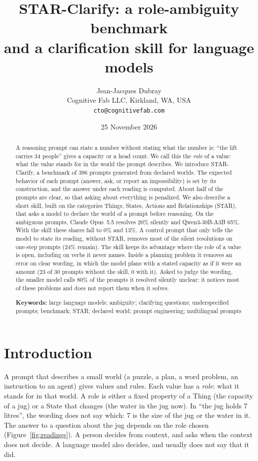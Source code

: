 \documentclass[11pt,a4paper]{article}
\title{\vspace{-1.2cm}\bfseries STAR-Clarify: a role-ambiguity benchmark\\
and a clarification skill for language models}
\author{Jean-Jacques Dubray\\[2pt]
\small Cognitive Fab LLC, Kirkland, WA, USA\\
\small \texttt{cto@cognitivefab.com}}
\date{25 November 2026}
\begin{document}
\maketitle

\begin{abstract}
\noindent
A reasoning prompt can state a number without stating what the number is:
``the lift carries 34 people'' gives a capacity or a head count. We call
this the \emph{role} of a value: what the value stands for in the world
the prompt describes. We introduce STAR-Clarify, a benchmark of 396
prompts generated from declared worlds. The expected behavior of each
prompt (answer, ask, or report an impossibility) is set by its
construction, and the answer under each reading is computed. About half of the prompts are clear, so that asking
about everything is penalized. We also describe a short skill, built on
the categories Things, States, Actions and Relationships (STAR), that asks
a model to declare the world of a prompt before reasoning. On the
ambiguous prompts, Claude Opus~5.5 resolves 20\% silently and
Qwen3-30B-A3B 65\%. With the skill these shares fall to 0\% and 13\%. A
control prompt that only tells the model to state its reading, without
STAR, removes most of the silent resolutions on one-step prompts (24\%
remain). The skill keeps its advantage where the role of a value is open,
including on verbs it never names. Inside a planning problem it removes
an error on clear wording, in which the model plans with a stated
capacity as if it were an amount (23 of 30 prompts without the skill, 0
with it). Asked to judge the wording, the smaller model calls 80\% of
the prompts it resolved silently unclear: it notices most of these
problems and does not report them when it solves.

\medskip\noindent\textbf{Keywords:} large language models; ambiguity;
clarifying questions; underspecified prompts; benchmark; STAR; declared
world; prompt engineering; multilingual prompts
\end{abstract}

\section{Introduction}

A prompt that describes a small world (a puzzle, a plan, a word problem, an
instruction to an agent) gives values and rules. Each value has a
\emph{role}: what it stands for in that world. A role is either a fixed
property of a Thing (the capacity of a jug) or a State that changes (the
water in the jug now). In ``the jug holds 7 litres'', the wording does not
say which: 7 is the size of the jug or the water in it. The answer to a
question about the jug depends on the role chosen
(Figure~\ref{fig:readings}). A person decides from context, and asks when
the context does not decide. A language model also decides, and usually
does not say that it did.
\end{document}
